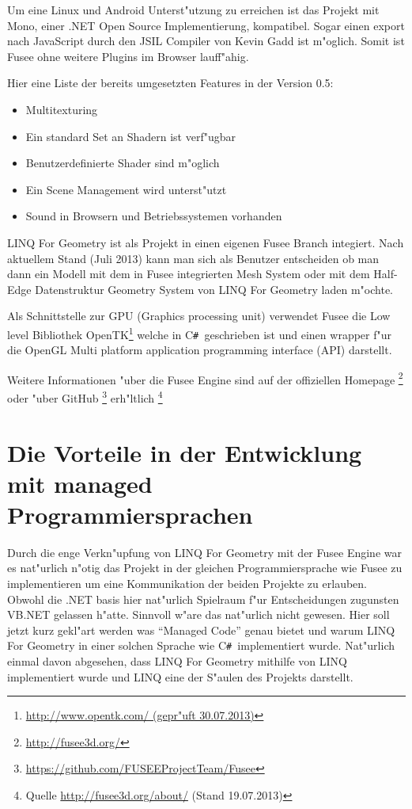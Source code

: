 \documentclass[pagesize, paper=a4, fontsize=12pt,titlepage=true, headings=small, headnosepline, abstractoff, liststotoc, nochapterprefix, plainheadsepline]{scrreprt}
\newcommand{\CSS}{C\texttt{\# }}
\newcommand{\LFGS}{LINQ For Geometry }
\newcommand{\HES}{Half-Edge Datenstruktur }
\begin{document}
Um eine Linux und Android Unterst"utzung zu erreichen ist das Projekt mit Mono, einer .NET Open Source Implementierung, kompatibel. Sogar einen export nach JavaScript durch den JSIL Compiler von Kevin Gadd ist m"oglich. Somit ist Fusee ohne weitere Plugins im Browser lauff"ahig.

Hier eine Liste der bereits umgesetzten Features in der Version 0.5:
\begin{itemize}
\item Multitexturing
\item Ein standard Set an Shadern ist verf"ugbar
\item Benutzerdefinierte Shader sind m"oglich
\item Ein Scene Management wird unterst"utzt
\item Sound in Browsern und Betriebssystemen vorhanden
\end{itemize}

\LFGS ist als Projekt in einen eigenen Fusee Branch integiert. Nach aktuellem Stand (Juli 2013) kann man sich als Benutzer entscheiden ob man dann ein Modell mit dem in Fusee integrierten Mesh System oder mit dem \HES Geometry System von \LFGS laden m"ochte.

Als Schnittstelle zur GPU (Graphics processing unit) verwendet Fusee die Low level Bibliothek OpenTK\footnote{\url{http://www.opentk.com/ (gepr"uft 30.07.2013)}} welche in \CSS geschrieben ist und einen wrapper f"ur die OpenGL Multi platform application programming interface (API) darstellt.

Weitere Informationen "uber die Fusee Engine sind auf der offiziellen Homepage \footnote[1]{\url{http://fusee3d.org/}} oder "uber GitHub \footnote[2]{\url{https://github.com/FUSEEProjectTeam/Fusee}} erh"ltlich \footnote[3]{Quelle \url{http://fusee3d.org/about/} (Stand 19.07.2013)}
\section {Die Vorteile in der Entwicklung mit managed Programmiersprachen}\label{sec:VorteileManaged}
Durch die enge Verkn"upfung von \LFGS mit der Fusee Engine war es nat"urlich n"otig das Projekt in der gleichen Programmiersprache wie Fusee zu implementieren um eine Kommunikation der beiden Projekte zu erlauben. Obwohl die .NET basis hier nat"urlich Spielraum f"ur Entscheidungen zugunsten VB.NET gelassen h"atte. Sinnvoll w"are das nat"urlich nicht gewesen. Hier soll jetzt kurz gekl"art werden was "`Managed Code"' genau bietet und warum \LFGS in einer solchen Sprache wie \CSS implementiert wurde. Nat"urlich einmal davon abgesehen, dass \LFGS mithilfe von LINQ implementiert wurde und LINQ eine der S"aulen des Projekts darstellt.
\end{document}
